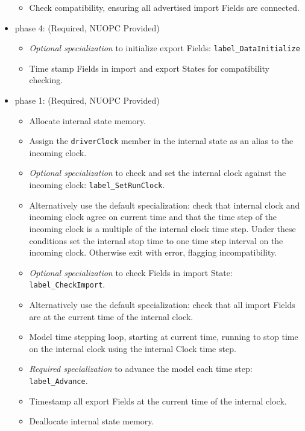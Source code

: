 \begin{itemize}
\begin{itemize}
  \item Check compatibility, ensuring all advertised import Fields are connected.
  \end{itemize}  
\item phase 4: ({\sc Required, NUOPC Provided})
  \begin{itemize}
  \item {\it Optional specialization} to initialize export Fields: {\tt label\_DataInitialize}
  \item Time stamp Fields in import and export States for compatibility checking.
  \end{itemize}    
\end{itemize}

\begin{itemize}
\item phase 1: ({\sc Required, NUOPC Provided})
  \begin{itemize}
  \item Allocate internal state memory.
  \item Assign the {\tt driverClock} member in the internal state as an alias to the incoming clock.
  \item {\it Optional specialization} to check and set the internal clock against the incoming clock: {\tt label\_SetRunClock}.
  \item Alternatively use the default specialization: check that internal clock and incoming clock agree on current time and that the time step of the incoming clock is a multiple of the internal clock time step. Under these conditions set the internal stop time to one time step interval on the incoming clock. Otherwise exit with error, flagging incompatibility.
  \item {\it Optional specialization} to check Fields in import State: {\tt label\_CheckImport}.
  \item Alternatively use the default specialization: check that all import Fields are at the current time of the internal clock.
  \item Model time stepping loop, starting at current time, running to stop time on the internal clock using the internal Clock time step.
  \item {\it Required specialization} to advance the model each time step: {\tt label\_Advance}.
  \item Timestamp all export Fields at the current time of the internal clock.
  \item Deallocate internal state memory.
  \end{itemize}    
\end{itemize}

